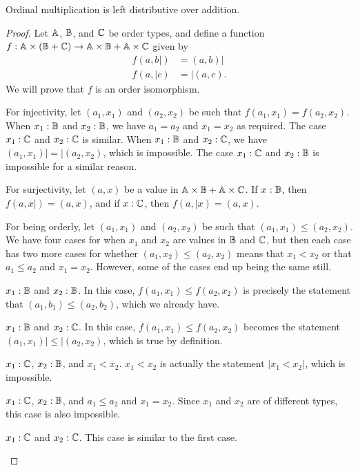 \documentclass[../../math.tex]{subfiles}
\begin{document}
\begin{instance}
    Ordinal multiplication is left distributive over addition.
\end{instance}
\begin{proof}
    Let $\mathbb{A}$, $\mathbb{B}$, and $\mathbb{C}$ be order types, and define a function $f : \mathbb{A}
    \times (\mathbb{B} + \mathbb{C}) \to \mathbb{A} \times \mathbb{B} + \mathbb{A} \times \mathbb{C}$ given by
    \begin{align*}
        f(a, b|) &= (a, b)| \\
        f(a, |c) &= |(a, c).
    \end{align*}
    We will prove that $f$ is an order isomorphism.

    For injectivity, let $(a_1, x_1)$ and $(a_2, x_2)$ be such that $f(a_1, x_1)
    = f(a_2, x_2)$.  When $x_1 : \mathbb{B}$ and $x_2 : \mathbb{B}$, we have $a_1 = a_2$ and
    $x_1 = x_2$ as required.  The case $x_1 : \mathbb{C}$ and $x_2 : \mathbb{C}$ is similar.
    When $x_1 : \mathbb{B}$ and $x_2 : \mathbb{C}$, we have $(a_1, x_1)| = |(a_2, x_2)$, which
    is impossible.  The case $x_1 : \mathbb{C}$ and $x_2 : \mathbb{B}$ is impossible for a
    similar reason.

    For surjectivity, let $(a, x)$ be a value in $\mathbb{A} \times \mathbb{B} + \mathbb{A} \times \mathbb{C}$.
    If $x : \mathbb{B}$, then $f(a, x|) = (a, x)$, and if $x : \mathbb{C}$, then $f(a, |x) = (a,
    x)$.

    For being orderly, let $(a_1, x_1)$ and $(a_2, x_2)$ be such that $(a_1,
    x_1) \leq (a_2, x_2)$.  We have four cases for when $x_1$ and $x_2$ are
    values in $\mathbb{B}$ and $\mathbb{C}$, but then each case has two more cases for whether
    $(a_1, x_2) \leq (a_2, x_2)$ means that $x_1 < x_2$ or that $a_1 \leq a_2$
    and $x_1 = x_2$.  However, some of the cases end up being the same still.
    \begin{case} $x_1 : \mathbb{B}$ and $x_2 : \mathbb{B}$.
        In this case, $f(a_1, x_1) \leq f(a_2, x_2)$ is precisely the statement
        that $(a_1, b_1) \leq (a_2, b_2)$, which we already have.
    \end{case}
    \begin{case} $x_1 : \mathbb{B}$ and $x_2 : \mathbb{C}$.
        In this case, $f(a_1, x_1) \leq f(a_2, x_2)$ becomes the statement
        $(a_1, x_1)| \leq |(a_2, x_2)$, which is true by definition.
    \end{case}
    \begin{case} $x_1 : \mathbb{C}$, $x_2 : \mathbb{B}$, and $x_1 < x_2$.
        $x_1 < x_2$ is actually the statement $|x_1 < x_2|$, which is
        impossible.
    \end{case}
    \begin{case} $x_1 : \mathbb{C}$, $x_2 : \mathbb{B}$, and $a_1 \leq a_2$ and $x_1 = x_2$.
        Since $x_1$ and $x_2$ are of different types, this case is also
        impossible.
    \end{case}
    \begin{case} $x_1 : \mathbb{C}$ and $x_2 : \mathbb{C}$.
        This case is similar to the first case.
    \end{case}
\end{proof}
\end{document}
